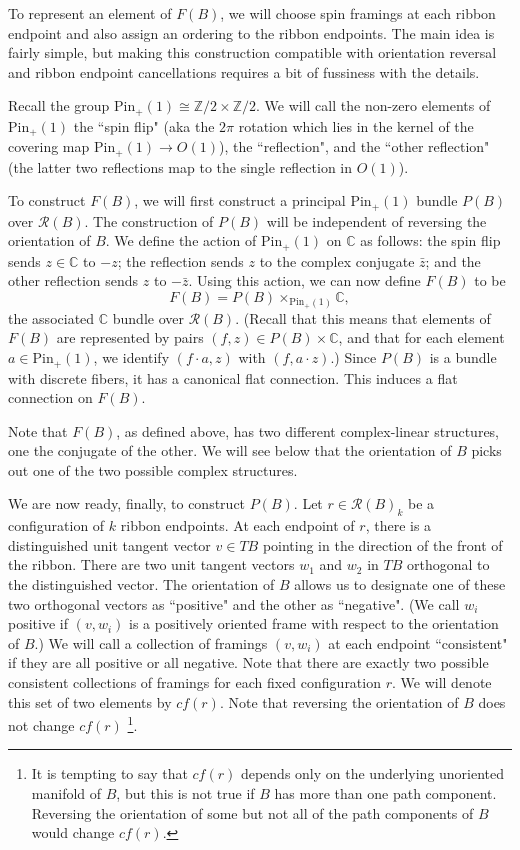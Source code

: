 \documentclass[12pt,a4paper]{article}
\newcommand{\zz}{\mathbb{Z}}
\newcommand{\cc}{\mathbb{C}}
\newcommand{\mcr}{\mathcal{R}}
\newcommand\be            {\begin{equation}}
\newcommand\ee            {\end{equation}}
\newcommand{\pin}{\text{Pin}}
\begin{document}
\medskip

To represent an element of $F(B)$, we will choose spin framings at each ribbon endpoint and also assign
an ordering to the ribbon endpoints.
The main idea is fairly simple, but making this construction compatible with orientation reversal
and ribbon endpoint cancellations requires a bit of fussiness with the details.

\medskip

Recall the group $\pin_+(1) \cong \zz/2 \times \zz/2$.
We will call the non-zero elements of $\pin_+(1)$ the ``spin flip" (aka the $2\pi$ rotation which lies in the kernel of the covering map
$\pin_+(1) \to O(1)$), the ``reflection", and the ``other reflection"
(the latter two reflections map to the single reflection in $O(1)$).

To construct $F(B)$, we will first construct a principal $\pin_+(1)$ bundle $P(B)$ over $\mcr(B)$.
The construction of $P(B)$ will be independent of reversing the orientation of $B$.
We define the action of $\pin_+(1)$ on $\cc$ as follows:
the spin flip sends $z\in \cc$ to $-z$;
the reflection sends $z$ to the complex conjugate $\bar z$;
and the other reflection sends $z$ to $-\bar z$.
Using this action, we can now define $F(B)$ to be
\be \label{fermbundef}
	F(B) = P(B) \times_{\pin_+(1)} \cc ,
\ee
the associated $\cc$ bundle over $\mcr(B)$.
(Recall that this means that elements of $F(B)$ are represented by pairs $(f, z) \in P(B) \times \cc$,
and that for each element $a \in \pin_+(1)$, we identify $(f\cdot a, z)$ with $(f, a \cdot z)$.)
Since $P(B)$ is a bundle with discrete fibers, it has a canonical flat connection.
This induces a flat connection on $F(B)$.

Note that $F(B)$, as defined above, has two different complex-linear structures, one the conjugate of the other.
We will see below that the orientation of $B$ picks out one of the two possible complex structures.

\medskip

We are now ready, finally, to construct $P(B)$.
Let $r \in \mcr(B)_k$ be a configuration of $k$ ribbon endpoints.
At each endpoint of $r$, there is a distinguished unit tangent vector $v \in TB$
pointing in the direction of the front of the ribbon.
There are two unit tangent vectors $w_1$ and $w_2$ in $TB$ orthogonal to the distinguished vector.
The orientation of $B$ allows us to designate one of these two orthogonal vectors as ``positive"
and the other as ``negative".
(We call $w_i$ positive if $(v, w_i)$ is a positively oriented frame with respect to the orientation of $B$.)
We will call a collection of framings $(v, w_i)$ at each endpoint ``consistent" if they are all positive
or all negative.
Note that there are exactly two possible consistent collections of framings for each fixed configuration $r$.
We will denote this set of two elements by $cf(r)$.
Note that reversing the orientation of $B$ does not change $cf(r)$
\footnote{It is tempting to say that $cf(r)$ depends only on the underlying unoriented manifold of $B$, but this
is not true if $B$ has more than one path component.
Reversing the orientation of some but not all of the path components of $B$ would change $cf(r)$.}.
\end{document}
